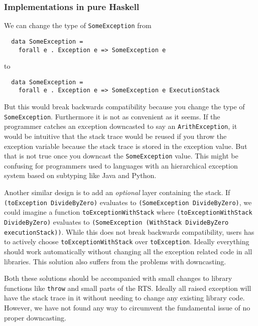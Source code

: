 \subsubsection{Implementations in pure Haskell}

We can change the type of \texttt{SomeException} from

\begin{verbatim}
  data SomeException =
    forall e . Exception e => SomeException e
\end{verbatim}

to

\begin{verbatim}
  data SomeException =
    forall e . Exception e => SomeException e ExecutionStack
\end{verbatim}

But this would break backwards compatibility because you change the type
of \texttt{SomeException}. Furthermore it is not as convenient as it
seems. If the programmer catches an exception downcasted to say an
\texttt{ArithException}, it would be intuitive that the stack trace
would be reused if you throw the exception variable because the stack
trace is stored in the exception value. But that is not true once you
downcast the \texttt{SomeException} value. This might be confusing for
programmers used to languages with an hierarchical exception system based on
subtyping like Java and Python.

Another similar design is to add an \emph{optional} layer containing
the stack. If \texttt{(toException DivideByZero)} evaluates to
\texttt{(SomeException DivideByZero)}, we could imagine a function
\texttt{toExceptionWithStack} where \texttt{(toExceptionWithStack
DivideByZero)} evaluates to \texttt{(SomeException (WithStack
DivideByZero executionStack))}. While this does not break backwards
compatibility, users has to actively choose
\texttt{toExceptionWithStack} over \texttt{toException}. Ideally
everything should work automatically without changing all the exception
related code in all libraries. This solution also suffers from the
problems with downcasting.

Both these solutions should be accompanied with small changes to library
functions like \texttt{throw} and small parts of the RTS. Ideally all
raised exception will have the stack trace in it without needing to
change any existing library code. However, we have not found any way to
circumvent the fundamental issue of no proper downcasting.

